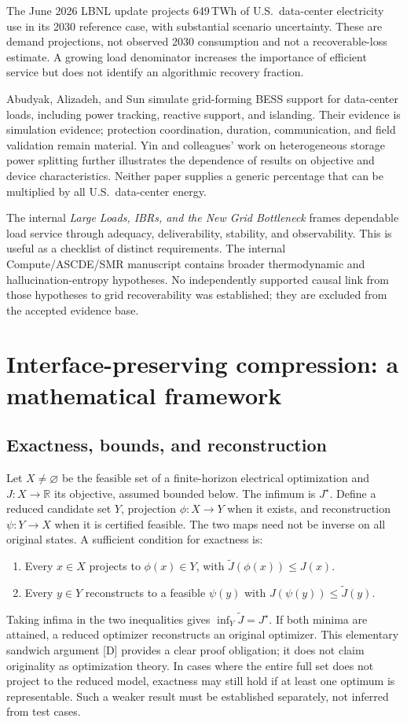 \documentclass[11pt,letterpaper]{article}
\begin{document}
The June 2026 LBNL update projects 649\,TWh of U.S.\ data-center electricity use in its 2030 reference case, with substantial scenario uncertainty. These are demand projections, not observed 2030 consumption and not a recoverable-loss estimate.\cite{lbnl} A growing load denominator increases the importance of efficient service but does not identify an algorithmic recovery fraction.

Abudyak, Alizadeh, and Sun simulate grid-forming BESS support for data-center loads, including power tracking, reactive support, and islanding.\cite{gfm} Their evidence is simulation evidence; protection coordination, duration, communication, and field validation remain material. Yin and colleagues' work on heterogeneous storage power splitting further illustrates the dependence of results on objective and device characteristics.\cite{split} Neither paper supplies a generic percentage that can be multiplied by all U.S.\ data-center energy.

The internal \emph{Large Loads, IBRs, and the New Grid Bottleneck} frames dependable load service through adequacy, deliverability, stability, and observability. This is useful as a checklist of distinct requirements.\cite{internaldls} The internal Compute/ASCDE/SMR manuscript contains broader thermodynamic and hallucination-entropy hypotheses. No independently supported causal link from those hypotheses to grid recoverability was established; they are excluded from the accepted evidence base.\cite{internalcompute}

\section{Interface-preserving compression: a mathematical framework}
\label{sec:compression}
\subsection{Exactness, bounds, and reconstruction}
Let $X\ne\varnothing$ be the feasible set of a finite-horizon electrical optimization and $J:X\to\mathbb R$ its objective, assumed bounded below. The infimum is $J^\star$. Define a reduced candidate set $Y$, projection $\phi:X\to Y$ when it exists, and reconstruction $\psi:Y\to X$ when it is certified feasible. The two maps need not be inverse on all original states. A sufficient condition for exactness is:
\begin{enumerate}
\item Every $x\in X$ projects to $\phi(x)\in Y$, with $\widetilde J(\phi(x))\le J(x)$.
\item Every $y\in Y$ reconstructs to a feasible $\psi(y)$ with $J(\psi(y))\le\widetilde J(y)$.
\end{enumerate}
Taking infima in the two inequalities gives $\inf_Y\widetilde J=J^\star$. If both minima are attained, a reduced optimizer reconstructs an original optimizer. This elementary sandwich argument [D] provides a clear proof obligation; it does not claim originality as optimization theory. In cases where the entire full set does not project to the reduced model, exactness may still hold if at least one optimum is representable. Such a weaker result must be established separately, not inferred from test cases.
\end{document}
